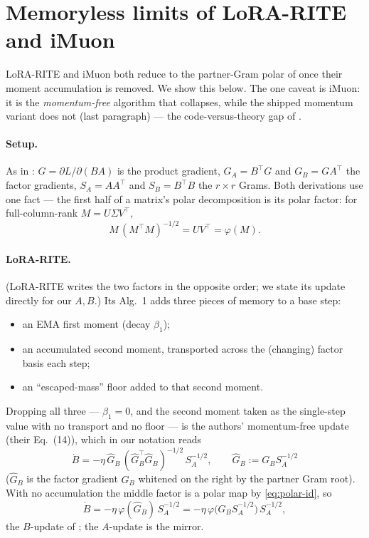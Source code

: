 \documentclass[11pt]{article}
\newcommand{\polar}{\varphi}                 %
\theoremstyle{plain}
\theoremstyle{definition}
\theoremstyle{remark}
\begin{document}
\section{Memoryless limits of LoRA-RITE and iMuon}
\label{app:memoryless}
LoRA-RITE \cite{lorarite} and iMuon \cite{imuon} both reduce to the partner-Gram polar of
 once their moment accumulation is removed. We show this below. The one
caveat is iMuon: it is the \emph{momentum-free} algorithm that collapses, while the shipped
momentum variant does not (last paragraph) --- the code-versus-theory gap of
.

\paragraph{Setup.} As in : $G=\partial L/\partial(BA)$ is the product
gradient, $G_A=B^\top G$ and $G_B=GA^\top$ the factor gradients, $S_A=AA^\top$ and
$S_B=B^\top B$ the $r\times r$ Grams. Both derivations use one fact --- the first half of a
matrix's polar decomposition is its polar factor: for full-column-rank $M=U\Sigma V^\top$,
\begin{equation}
  M\,(M^\top M)^{-1/2}=UV^\top=\polar(M).
  \label{eq:polar-id}
\end{equation}

\paragraph{LoRA-RITE.} (LoRA-RITE writes the two factors in the opposite order; we state its
update directly for our $A,B$.) Its Alg.~1 adds three pieces of memory to a base step:
\begin{itemize}[leftmargin=1.5em,itemsep=1pt,topsep=2pt]
  \item an EMA first moment (decay $\beta_1$);
  \item an accumulated second moment, transported across the (changing) factor basis each step;
  \item an ``escaped-mass'' floor added to that second moment.
\end{itemize}
Dropping all three --- $\beta_1{=}0$, and the second moment taken as the single-step value
with no transport and no floor --- is the authors' momentum-free update (their Eq.~(14)),
which in our notation reads
\begin{equation*}
  \dot B=-\eta\,\widehat G_B\,(\widehat G_B^\top\widehat G_B)^{-1/2}\,S_A^{-1/2},
  \qquad \widehat G_B:=G_B S_A^{-1/2}
\end{equation*}
($\widehat G_B$ is the factor gradient $G_B$ whitened on the right by the partner Gram root).
With no accumulation the middle factor is a polar map by \eqref{eq:polar-id}, so
\begin{equation*}
  \dot B=-\eta\,\polar(\widehat G_B)\,S_A^{-1/2}
  =-\eta\,\polar\!\big(G_B S_A^{-1/2}\big)\,S_A^{-1/2},
\end{equation*}
the $B$-update of ; the $A$-update is the mirror.
\end{document}
